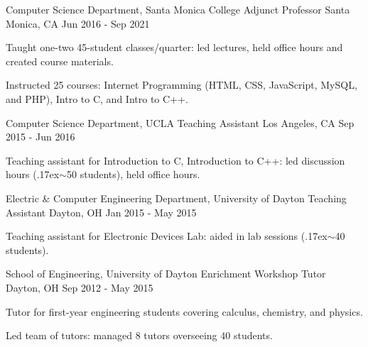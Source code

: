 


\begin{cventries}

\cventry
{Computer Science Department, Santa Monica College}
{Adjunct Professor}
{Santa Monica, CA}
{Jun 2016 - Sep 2021}
{
\begin{cvitems}
  \ifresume\else
  \item Taught one-two 45-student classes/quarter: led lectures, held office hours and created course materials.
  \fi
  \item Instructed 25 courses: Internet Programming (HTML, CSS, JavaScript, MySQL, and PHP), Intro to C, and Intro to C++.
\end{cvitems}
}


\cventry
{Computer Science Department, UCLA}
{Teaching Assistant}
{Los Angeles, CA}
{Sep 2015 - Jun 2016}
{
\begin{cvitems}
  \item Teaching assistant for Introduction to C, Introduction to C++: led discussion hours ({\raise.17ex\hbox{$\scriptstyle\sim$}}50 students), held office hours.
\end{cvitems}
}

\ifresume\else
\cventry
{Electric \& Computer Engineering Department, University of Dayton}
{Teaching Assistant}
{Dayton, OH}
{Jan 2015 - May 2015}
{
\begin{cvitems}
  \item Teaching assistant for Electronic Devices Lab: aided in lab sessions ({\raise.17ex\hbox{$\scriptstyle\sim$}}40 students).
\end{cvitems}
}

\cventry
{School of Engineering, University of Dayton}
{Enrichment Workshop Tutor}
{Dayton, OH}
{Sep 2012 - May 2015}
{
\begin{cvitems}
  \item Tutor for first-year engineering students covering calculus, chemistry, and physics.
  \item Led team of tutors: managed 8 tutors overseeing 40 students.
\end{cvitems}
}


\end{cventries}
